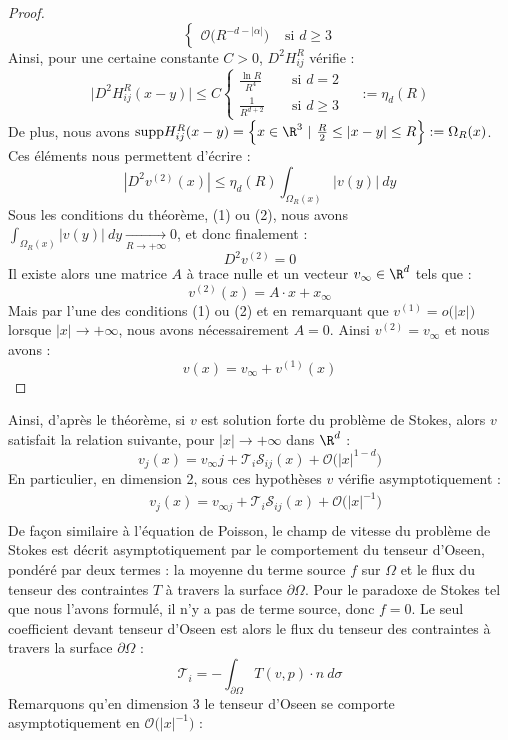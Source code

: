 \begin{proof}
$$\begin{cases}
        \mathcal{O}\Big( R^{-d - |\alpha|} \Big) &\text{ si } d \geq 3
    \end{cases} $$
    Ainsi, pour une certaine constante $C > 0$, $D^2H_{ij}^R$ vérifie :
    $$ \big|D^2 H_{ij}^R(x-y)\big| \leq C \begin{cases}
        \frac{\ln R}{R^4} \quad &\text{ si } d = 2 \\
        \frac{1}{R^{d + 2}} &\text{ si } d \geq 3
    \end{cases} \quad := \eta_d(R) $$
    De plus, nous avons $\text{supp}H_{ij}^R(x-y) = \Big\{ x \in \R^3 \ | \ \frac{R}{2} \leq |x - y| \leq R \Big\} := \Omega_R(x) $. Ces éléments nous permettent d'écrire :
    $$ |D^2 v^{(2)}(x)| \leq \eta_d(R) \int_{\Omega_R(x)} |v(y)| \ dy $$
    Sous les conditions du théorème, (1) ou (2), nous avons $\displaystyle \int_{\Omega_R(x)} |v(y)| \ dy \xrightarrow[R \to +\infty]{} 0$, et donc finalement :
    $$ D^2v^{(2)} = 0 $$
    Il existe alors une matrice $A$ à trace nulle et un vecteur $v_{\infty} \in \R^d$ tels que :
    $$ v^{(2)}(x) = A \cdot x + x_{\infty} $$
    Mais par l'une des conditions (1) ou (2) et en remarquant que $v^{(1)} = o\big(|x|\big)$ lorsque $|x| \to +\infty$, nous avons nécessairement $A = 0$. Ainsi $v^{(2)} = v_{\infty}$ et nous avons :
    $$ v(x) = v_{\infty} + v^{(1)}(x) $$
\end{proof}
Ainsi, d'après le théorème, si $v$ est solution forte du problème de Stokes, alors $v$ satisfait la relation suivante, pour $|x| \longrightarrow + \infty$ dans $\R^d$ :
$$ v_j(x) = v_{\infty}j + \mathcal{T}_i \mathscr{S}_{ij}(x) + \mathcal{O}\big(|x|^{1 - d}\big) $$
En particulier, en dimension 2, sous ces hypothèses $v$ vérifie asymptotiquement :
\begin{align*}
    &v_j(x) = v_{\infty j} + \mathcal{T}_i \mathscr{S}_{ij}(x) + \mathcal{O}\big(|x|^{-1}\big) \\
\end{align*}
De façon similaire à l'équation de Poisson, le champ de vitesse du problème de Stokes est décrit asymptotiquement par le comportement du tenseur d'Oseen, pondéré par deux termes : la moyenne du terme source $f$ sur $\Omega$ et le flux du tenseur des contraintes $T$ à travers la surface $\partial \Omega$. Pour le paradoxe de Stokes tel que nous l'avons formulé, il n'y a pas de terme source, donc $f = 0$.
Le seul coefficient devant tenseur d'Oseen est alors le flux du tenseur des contraintes à travers la surface $\partial \Omega$ :
$$\mathcal{T}_i = - \int_{\partial \Omega} T(v,p)\cdot n \ d\sigma$$
Remarquons qu'en dimension 3 le tenseur d'Oseen se comporte asymptotiquement en $\mathcal{O}\big(|x|^{-1}\big)$ :

